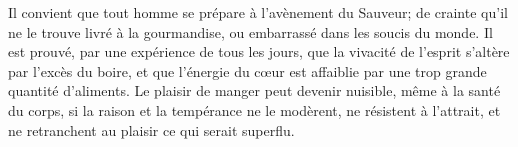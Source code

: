 Il convient que tout homme se prépare à l’avènement du Sauveur;
	de crainte qu’il ne le trouve livré à la gourmandise,
	ou embarrassé dans les soucis du monde.
Il est prouvé, par une expérience de tous les jours,
	que la vivacité de l’esprit s’altère par l’excès du boire,
	et que l’énergie du cœur
		est affaiblie par une trop grande quantité d’aliments.
Le plaisir de manger peut devenir nuisible, même à la santé du corps,
	si la raison et la tempérance ne le modèrent,
	ne résistent à l’attrait,
	et ne retranchent au plaisir ce qui serait superflu.
